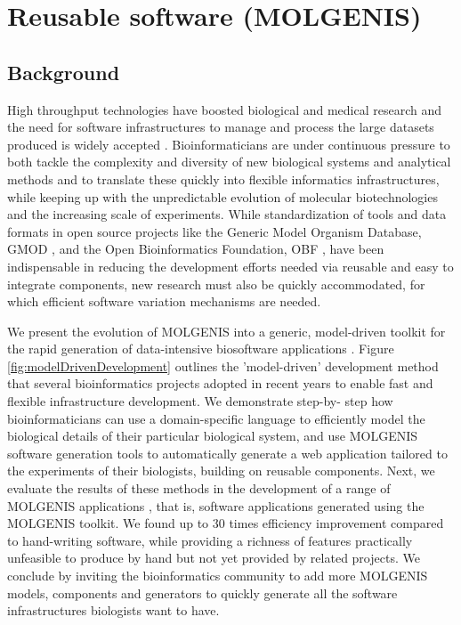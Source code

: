 \newpage

\section{Reusable software (MOLGENIS)}
\subsection{Background}
High throughput technologies have boosted biological and medical research and the need for software 
infrastructures to manage and process the large datasets produced is widely accepted \cite{Swertz:2007,
Stein:2008, Thorisson:2009}. Bioinformaticians are under continuous pressure to both tackle the complexity 
and diversity of new biological systems and analytical methods and to translate these quickly into 
flexible informatics infrastructures, while keeping up with the unpredictable evolution of molecular 
biotechnologies and the increasing scale of experiments. While standardization of tools and data formats 
in open source projects like the Generic Model Organism Database, GMOD \cite{OConnor:2008}, and the 
Open Bioinformatics Foundation, OBF \cite{OBF:2010:Online}, have been indispensable in reducing the 
development efforts needed via reusable and easy to integrate components, new research must also be 
quickly accommodated, for which efficient software variation mechanisms are needed.

We present the evolution of MOLGENIS into a generic, model-driven toolkit for the rapid generation of 
data-intensive biosoftware applications \cite{Swertz:2010a}. Figure \ref{fig:modelDrivenDevelopment} 
outlines the 'model-driven' development method that several bioinformatics projects adopted in recent 
years to enable fast and flexible infrastructure development. We demonstrate step-by-
step how bioinformaticians can use a domain-specific language to efficiently model the biological 
details of their particular biological system, and use MOLGENIS software generation tools to 
automatically generate a web application tailored to the experiments of their biologists, 
building on reusable components. Next, we evaluate the results of these methods in the development 
of a range of MOLGENIS applications \cite{Swertz:2004, Swertz:2010a, Thorisson:2009, Leu:2010, 
Li:2009, Smedley:2008}, that is, software applications generated using the MOLGENIS toolkit. We found 
up to 30 times efficiency improvement compared to hand-writing software, while providing a richness 
of features practically unfeasible to produce by hand but not yet provided by related projects. We 
conclude by inviting the bioinformatics community to add more MOLGENIS models, components and 
generators to quickly generate all the software infrastructures biologists want to have.

